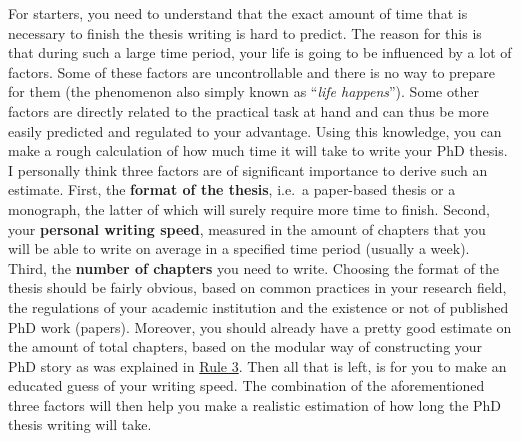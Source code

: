 \documentclass[
  12pt,
]{book}
\begin{document}
For starters, you need to understand that the exact amount of time that is necessary to finish the thesis writing is hard to predict.
The reason for this is that during such a large time period, your life is going to be influenced by a lot of factors.
Some of these factors are uncontrollable and there is no way to prepare for them (the phenomenon also simply known as ``\emph{life happens}'').
Some other factors are directly related to the practical task at hand and can thus be more easily predicted and regulated to your advantage.
Using this knowledge, you can make a rough calculation of how much time it will take to write your PhD thesis.
I personally think three factors are of significant importance to derive such an estimate.
First, the \textbf{format of the thesis}, i.e.~a paper-based thesis or a monograph, the latter of which will surely require more time to finish.
Second, your \textbf{personal writing speed}, measured in the amount of chapters that you will be able to write on average in a specified time period (usually a week).
Third, the \textbf{number of chapters} you need to write.
Choosing the format of the thesis should be fairly obvious, based on common practices in your research field, the regulations of your academic institution and the existence or not of published PhD work (papers).
Moreover, you should already have a pretty good estimate on the amount of total chapters, based on the modular way of constructing your PhD story as was explained in \protect\hyperlink{rule3}{Rule 3}.
Then all that is left, is for you to make an educated guess of your writing speed.
The combination of the aforementioned three factors will then help you make a realistic estimation of how long the PhD thesis writing will take.
\end{document}

